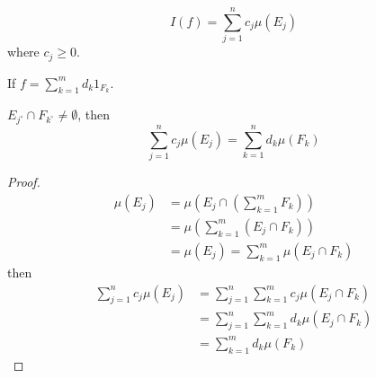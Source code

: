 \begin{equation}
I\left( f \right) = \sum\limits_{j = 1}^n {{c_j}\mu \left( {{E_j}} \right)} 
\label{eq10.14}
\end{equation}
where ${c_j} \geqslant 0$.

If $f = \sum\limits_{k = 1}^m {{d_k}{1_{{F_k}}}} $.

\begin{proposition}
	${E_{{j^ \circ }}} \cap {F_{{k^ \circ }}} \ne \emptyset $, then 
	\begin{equation}
	\sum\limits_{j = 1}^n {{c_j}\mu \left( {{E_j}} \right)}  = \sum\limits_{k = 1}^n {{d_k}\mu \left( {{F_k}} \right)} 
	\end{equation}
	\label{prop10.2}
\end{proposition}

\begin{proof}
	\begin{equation}
	\begin{split}
	\mu \left( {{E_j}} \right) & = \mu \left( {{E_j} \cap \left( {\sum\limits_{k = 1}^m {{F_k}} } \right)} \right)\\
							   & = \mu \left( {\sum\limits_{k = 1}^m {{{\left( {{E_j} \cap F_{k}} \right)}}} } \right)\\
							   & = \mu \left( {{E_j}} \right) = \sum\limits_{k = 1}^m {\mu \left( {{E_j} \cap {F_k}} \right)}
	\end{split}
	\label{eq10.16}
	\end{equation}
	then
	\begin{equation}
	\begin{split}
	\sum\limits_{j = 1}^n {{c_j}\mu \left( {{E_j}} \right)} & = \sum\limits_{j = 1}^n {\sum\limits_{k = 1}^m {{c_j}\mu \left( {{E_j} \cap {F_k}} \right)} } \\
															&  = \sum\limits_{j = 1}^n {\sum\limits_{k = 1}^m {{d_k}\mu \left( {{E_j} \cap {F_k}} \right)} } \\
															& = \sum\limits_{k = 1}^m {{d_k}\mu \left( {{F_k}} \right)} 
	\end{split}
	\end{equation}
\end{proof}

